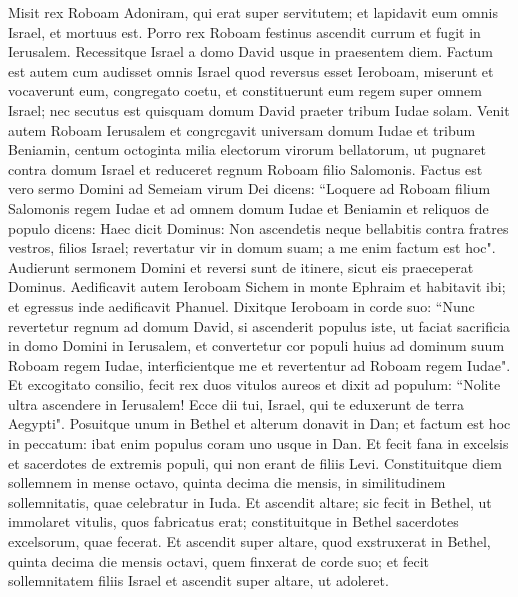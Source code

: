 \begin{biblechapter}
\verse Misit rex Roboam Adoniram, qui erat super servitutem; et lapidavit eum omnis Israel, et mortuus est. Porro rex Roboam festinus ascendit currum et fugit in Ierusalem. 
\verse Recessitque Israel a domo David usque in praesentem diem. 
\verse Factum est autem cum audisset omnis Israel quod reversus esset Ieroboam, miserunt et vocaverunt eum, congregato coetu, et constituerunt eum regem super omnem Israel; nec secutus est quisquam domum David praeter tribum Iudae solam. 
\verse Venit autem Roboam Ierusalem et congrcgavit universam domum Iudae et tribum Beniamin, centum octoginta milia electorum virorum bellatorum, ut pugnaret contra domum Israel et reduceret regnum Roboam filio Salomonis. 
\verse Factus est vero sermo Domini ad Semeiam virum Dei dicens: 
\verse “Loquere ad Roboam filium Salomonis regem Iudae et ad omnem domum Iudae et Beniamin et reliquos de populo dicens: 
\verse Haec dicit Dominus: Non ascendetis neque bellabitis contra fratres vestros, filios Israel; revertatur vir in domum suam; a me enim factum est hoc". Audierunt sermonem Domini et reversi sunt de itinere, sicut eis praeceperat Dominus. 
\verse Aedificavit autem Ieroboam Sichem in monte Ephraim et habitavit ibi; et egressus inde aedificavit Phanuel. 
\verse Dixitque Ieroboam in corde suo: “Nunc revertetur regnum ad domum David,  
\verse si ascenderit populus iste, ut faciat sacrificia in domo Domini in Ierusalem, et convertetur cor populi huius ad dominum suum Roboam regem Iudae, interficientque me et revertentur ad Roboam regem Iudae". 
\verse Et excogitato consilio, fecit rex duos vitulos aureos et dixit ad populum: “Nolite ultra ascendere in Ierusalem! Ecce dii tui, Israel, qui te eduxerunt de terra Aegypti". 
\verse Posuitque unum in Bethel et alterum donavit in Dan; 
\verse et factum est hoc in peccatum: ibat enim populus coram uno usque in Dan. 
\verse Et fecit fana in excelsis et sacerdotes de extremis populi, qui non erant de filiis Levi.  
\verse Constituitque diem sollemnem in mense octavo, quinta decima die mensis, in similitudinem sollemnitatis, quae celebratur in Iuda. Et ascendit altare; sic fecit in Bethel, ut immolaret vitulis, quos fabricatus erat; constituitque in Bethel sacerdotes excelsorum, quae fecerat. 
\verse Et ascendit super altare, quod exstruxerat in Bethel, quinta decima die mensis octavi, quem finxerat de corde suo; et fecit sollemnitatem filiis Israel et ascendit super altare, ut adoleret. 
\end{biblechapter}

